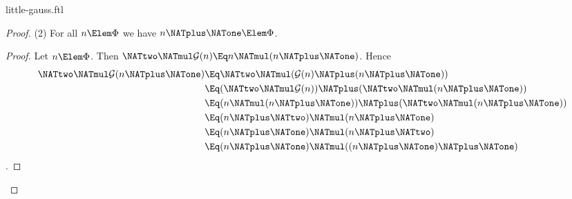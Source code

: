 \documentclass{stex}
\newcommand{\gauss}{\mathcal{G}}
\begin{document}
\begin{smodule}{little-gauss.ftl}
\begin{forthel}
\begin{proof}
    (2) For all $n \Elem \Phi$ we have $n \NATplus \NATone \Elem \Phi$.
    \begin{proof}
      Let $n \Elem \Phi$.
      Then $\NATtwo \NATmul \gauss(n) \Eq n \NATmul (n \NATplus \NATone)$.
      Hence
      \begin{align*}
              \NATtwo \NATmul \gauss(n \NATplus \NATone)
        & \Eq \NATtwo \NATmul (\gauss(n) \NATplus (n \NATplus \NATone)) \\
        & \Eq (\NATtwo \NATmul \gauss(n)) \NATplus (\NATtwo \NATmul (n \NATplus \NATone)) \\
        & \Eq (n \NATmul (n \NATplus \NATone)) \NATplus (\NATtwo \NATmul (n \NATplus \NATone)) \\
        & \Eq (n \NATplus \NATtwo) \NATmul (n \NATplus \NATone) \\
        & \Eq (n \NATplus \NATone) \NATmul (n \NATplus \NATtwo) \\
        & \Eq (n \NATplus \NATone) \NATmul ((n \NATplus \NATone) \NATplus \NATone)
      \end{align*}.
    \end{proof}
  \end{proof}
\end{forthel}

\printbibliography
{}
\end{smodule}
\end{document}
